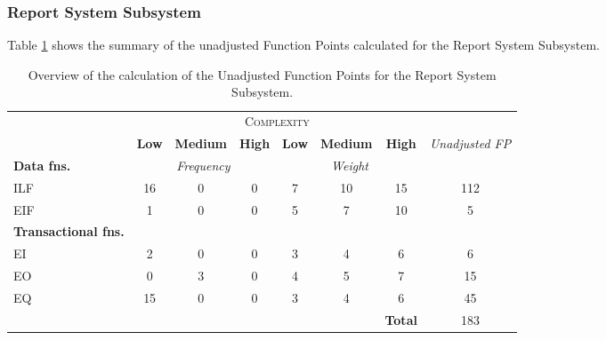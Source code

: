 \subsubsection{Report System Subsystem}
Table \ref{tbl_RSS_UFP} shows the summary of the unadjusted Function Points calculated for the Report System Subsystem.
\begin{table}[hbtp]
\centering
\begin{tabular}{|l|c|c|c|c|c|c|c|}
\cline{2-7}
\multicolumn{1}{c}{} & \multicolumn{6}{|c|}{\textsc{Complexity}} & \multicolumn{1}{c}{}  \\ \cline{2-8}
\multicolumn{1}{c|}{} & \textbf{Low} & \textbf{Medium} & \textbf{High} & \textbf{Low} & \textbf{Medium} & \textbf{High} & \multirow{2}{*}{\textit{Unadjusted FP}} \\ \cline{1-7}
\textbf{Data fns.} & \multicolumn{3}{|c|}{\textit{Frequency}} &  \multicolumn{3}{|c|}{\textit{Weight}} & \\ \hline
ILF 	& 16 & 0 & 0 & 7 & 10 & 15 & 112 	\\ \hline
EIF 	& 1  & 0 & 0 & 5 & 7  & 10 & 5		\\ \hline
\textbf{Transactional fns.} & \multicolumn{7}{|c|}{} \\ \hline
EI 		& 2  & 0 & 0 & 3 & 4  & 6  & 6 		\\ \hline
EO 		& 0  & 3 & 0 & 4 & 5  & 7  & 15		\\ \hline
EQ		& 15 & 0 & 0 & 3 & 4  & 6  & 45		\\ \hline
\multicolumn{6}{c|}{} & \textbf{Total} & 183 \\ \cline{7-8}
\end{tabular}
\caption{Overview of the calculation of the Unadjusted Function Points for the Report System Subsystem.}
\label{tbl_RSS_UFP}
\end{table}

